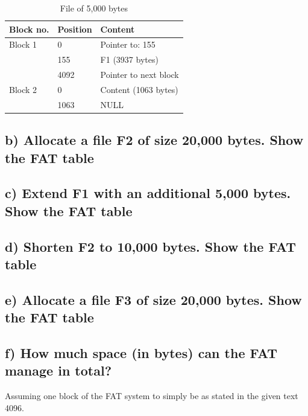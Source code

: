 \documentclass[11pt,a4paper]{article}
\theoremstyle{plain}
\theoremstyle{definition}
\theoremstyle{remark}
\numberwithin{equation}{section}
\begin{document}
\begin{table}[H]
    \centering
    \caption{File of 5,000 bytes}
    \label{t3-a}
    \begin{tabular}{lll}
        Block no.                     & Position                  & Content                                    \\ \hline
        \multicolumn{1}{|l|}{Block 1} & \multicolumn{1}{l|}{0}    & \multicolumn{1}{l|}{Pointer to: 155}       \\ \hline
        \multicolumn{1}{|l|}{}        & \multicolumn{1}{l|}{155}  & \multicolumn{1}{l|}{F1 (3937 bytes)}       \\ \hline
        \multicolumn{1}{|l|}{}        & \multicolumn{1}{l|}{4092} & \multicolumn{1}{l|}{Pointer to next block} \\ \hline
        \multicolumn{1}{|l|}{Block 2} & \multicolumn{1}{l|}{0}    & \multicolumn{1}{l|}{Content (1063 bytes)}  \\ \hline
        \multicolumn{1}{|l|}{}        & \multicolumn{1}{l|}{1063} & \multicolumn{1}{l|}{NULL}                  \\ \hline
    \end{tabular}
\end{table}

\subsection*{b) Allocate a file F2 of size 20,000 bytes. Show the FAT table}

\subsection*{c) Extend F1 with an additional 5,000 bytes. Show the FAT table}

\subsection*{d) Shorten F2 to 10,000 bytes. Show the FAT table}

\subsection*{e) Allocate a file F3 of size 20,000 bytes. Show the FAT table}

\subsection*{f) How much space (in bytes) can the FAT manage in total?}
Assuming one block of the FAT system to simply be as stated in the given text 4096.
\end{document}
